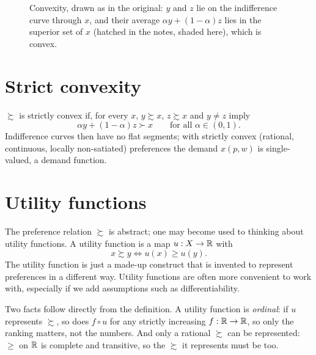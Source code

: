 \documentclass[11pt]{article}
\begin{document}
\begin{figure}[ht]
\centering
{}
\caption{Convexity, drawn as in the original: $y$ and $z$ lie on the
indifference curve through $x$, and their average $\alpha y+(1-\alpha)z$ lies in
the superior set of $x$ (hatched in the notes, shaded here), which is convex.}
\end{figure}


\section{Strict convexity}

 $\succsim$ is strictly convex if, for every $x$,
$y\succsim x$, $z\succsim x$ and $y\ne z$ imply
\[ \alpha y+(1-\alpha)z\succ x \qquad \text{for all } \alpha\in(0,1). \]
Indifference curves then have no flat segments; with strictly convex (rational, continuous,
locally non-satiated) preferences the demand $x(p,w)$ is single-valued, a demand function.


\section{Utility functions}

The preference relation $\succsim$ is abstract; one may become used to thinking
about utility functions. A utility function is a map $u:X\to\mathbb{R}$ with
\[ x\succsim y \iff u(x)\ge u(y). \]
The utility function is just a made-up construct that is invented to represent
preferences in a different way. Utility functions are often more convenient to
work with, especially if we add assumptions such as differentiability.

Two facts follow directly from the definition. A utility function is \emph{ordinal}:
if $u$ represents $\succsim$, so does $f\circ u$ for any strictly increasing
$f:\mathbb{R}\to\mathbb{R}$, so only the ranking matters, not the numbers. And only a rational
$\succsim$ can be represented: $\ge$ on $\mathbb{R}$ is complete and transitive, so the
$\succsim$ it represents must be too.
\end{document}
